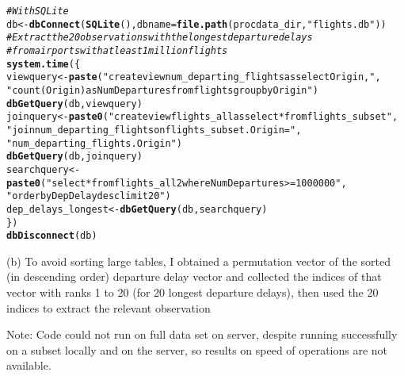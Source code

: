 \documentclass{article}\usepackage[]{graphicx}\usepackage[]{color}
\makeatletter
\newcommand{\hlstr}[1]{\textcolor[rgb]{0.192,0.494,0.8}{#1}}%
\newcommand{\hlcom}[1]{\textcolor[rgb]{0.678,0.584,0.686}{\textit{#1}}}%
\newcommand{\hlstd}[1]{\textcolor[rgb]{0.345,0.345,0.345}{#1}}%
\newcommand{\hlkwb}[1]{\textcolor[rgb]{0.69,0.353,0.396}{#1}}%
\newcommand{\hlkwc}[1]{\textcolor[rgb]{0.333,0.667,0.333}{#1}}%
\newcommand{\hlkwd}[1]{\textcolor[rgb]{0.737,0.353,0.396}{\textbf{#1}}}%
\newenvironment{kframe}{%
 \def\at@end@of@kframe{}%
 \ifinner\ifhmode%
  \def\at@end@of@kframe{\end{minipage}}%
  \begin{minipage}{\columnwidth}%
 \fi\fi%
 \def\FrameCommand##1{\hskip\@totalleftmargin \hskip-\fboxsep
 \colorbox{shadecolor}{##1}\hskip-\fboxsep
     \hskip-\linewidth \hskip-\@totalleftmargin \hskip\columnwidth}%
 \MakeFramed {\advance\hsize-\width
   \@totalleftmargin\z@ \linewidth\hsize
   \@setminipage}}%
 {\par\unskip\endMakeFramed%
 \at@end@of@kframe}
\newenvironment{knitrout}{}{} %
\makeatother
\begin{document}
\begin{knitrout}
\color{fgcolor}\begin{kframe}
\begin{alltt}
\hlcom{# With SQLite}
\hlstd{db} \hlkwb{<-} \hlkwd{dbConnect}\hlstd{(}\hlkwd{SQLite}\hlstd{(),} \hlkwc{dbname} \hlstd{=} \hlkwd{file.path}\hlstd{(procdata_dir,} \hlstr{"flights.db"}\hlstd{))}
\hlcom{# Extract the 20 observations with the longest departure delays }
\hlcom{# from airports with at least 1 million flights}
\hlkwd{system.time}\hlstd{(\{}
  \hlstd{viewquery} \hlkwb{<-} \hlkwd{paste}\hlstd{(}\hlstr{"create view num_departing_flights as select Origin,"}\hlstd{,}
                     \hlstr{"count(Origin) as NumDepartures from flights group by Origin"}\hlstd{)}
  \hlkwd{dbGetQuery}\hlstd{(db, viewquery)}
  \hlstd{joinquery} \hlkwb{<-} \hlkwd{paste0}\hlstd{(}\hlstr{"create view flights_all as select * from flights_subset "}\hlstd{,}
                      \hlstr{"join num_departing_flights on flights_subset.Origin = "}\hlstd{,}
                      \hlstr{"num_departing_flights.Origin"}\hlstd{)}
  \hlkwd{dbGetQuery}\hlstd{(db, joinquery)}
  \hlstd{searchquery} \hlkwb{<-} \hlkwd{paste0}\hlstd{(}\hlstr{"select * from flights_all2 where NumDepartures >= 1000000 "}\hlstd{,}
                        \hlstr{"order by DepDelay desc limit 20"}\hlstd{)}
  \hlstd{dep_delays_longest} \hlkwb{<-} \hlkwd{dbGetQuery}\hlstd{(db, searchquery)}
\hlstd{\})}
\hlkwd{dbDisconnect}\hlstd{(db)}
\end{alltt}
\end{kframe}
\end{knitrout}
(b) To avoid sorting large tables, I obtained a permutation vector of the sorted (in descending order) departure delay vector and collected the indices of that vector with ranks 1 to 20 (for 20 longest departure delays), then used the 20 indices to extract the relevant observation

Note: Code could not run on full data set on server, despite running successfully on a subset locally and on the server, so results on speed of operations are not available.
\end{document}
